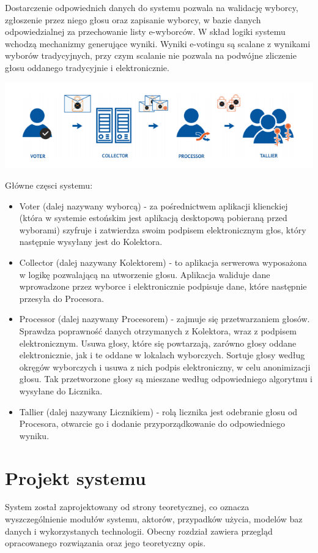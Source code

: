 \documentclass[a4paper,13pt]{report}
\begin{document}
Dostarczenie odpowiednich danych do systemu pozwala na walidację wyborcy, zgłoszenie przez 
niego głosu oraz zapisanie wyborcy, w bazie danych odpowiedzialnej za przechowanie listy e-wyborców. W skład logiki systemu wchodzą mechanizmy generujące wyniki. Wyniki e-votingu są scalane z wynikami wyborów tradycyjnych, przy czym scalanie nie pozwala na podwójne zliczenie głosu oddanego tradycyjnie i elektronicznie.


\includegraphics[width=\textwidth]{images/Główne częsci systemu estońskiego.png}

Główne częsci systemu:
\begin{itemize}
    \item Voter (dalej nazywany wyborcą) - za pośrednictwem aplikacji klienckiej (która w systemie estońskim jest aplikacją desktopową pobieraną przed wyborami) szyfruje i zatwierdza swoim podpisem elektronicznym głos, który następnie wysyłany jest do Kolektora.
    \item Collector (dalej nazywany Kolektorem) - to aplikacja serwerowa wyposażona w logikę pozwalającą na utworzenie głosu. Aplikacja waliduje dane wprowadzone przez wyborce i elektronicznie podpisuje dane, które następnie przesyła do Procesora.
    \item Processor (dalej nazywany Procesorem) - zajmuje się przetwarzaniem głosów. Sprawdza poprawność danych otrzymanych z Kolektora, wraz z podpisem elektronicznym. Usuwa głosy, które się powtarzają, zarówno głosy oddane elektronicznie, jak i te oddane w lokalach wyborczych. Sortuje głosy według okręgów wyborczych i usuwa z nich podpis elektroniczny, w celu anonimizacji głosu. Tak przetworzone głosy są mieszane według odpowiedniego algorytmu i wysyłane do Licznika.
    \item Tallier (dalej nazywany Licznikiem) - rolą licznika jest odebranie głosu od Procesora, otwarcie go i dodanie przyporządkowanie do odpowiedniego wyniku.
\end{itemize}
\chapter{Projekt systemu}
System został zaprojektowany od strony teoretycznej, co oznacza wyszczególnienie modułów systemu, aktorów, przypadków użycia, modelów baz danych i wykorzystanych technologii. Obecny rozdział zawiera przegląd opracowanego rozwiązania oraz jego teoretyczny opis.
\end{document}
